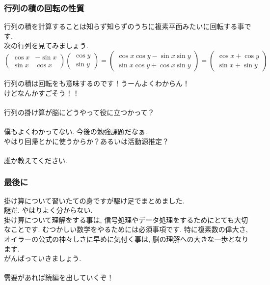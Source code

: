 \documentclass[11pt,a4paper]{jsarticle}
\begin{document}
\subsubsection{行列の積の回転の性質}
行列の積を計算することは知らず知らずのうちに複素平面みたいに回転する事です. \\
次の行列を見てみましょう.\\
\[
  \left(	
  \begin{array}{cc}
  \cos x & -\sin x \\
  \sin x & \cos x
  \end{array}
  \right)
  \left(
  \begin{array}{c}
  \cos y \\
  \sin y
  \end{array}
  \right)
  =
  \left(
  \begin{array}{l}
  \cos x\cos y - \sin x\sin y\\
  \sin x\cos y + \cos x\sin y
  \end{array}
  \right)
  =
  \left(
  \begin{array}{c}
  \cos x + \cos y\\
  \sin x + \sin y
  \end{array}
  \right)
\]

行列の積は回転をも意味するのです！うーんよくわからん！\\
けどなんかすごそう！！\\
\\
行列の掛け算が脳にどうやって役に立つかって？\\
\\
僕もよくわかってない. 今後の勉強課題だなぁ.\\
やはり回帰とかに使うからか？あるいは活動源推定？\\
\\
誰か教えてください.\\
\subsubsection{最後に}
掛け算について習いたての身ですが駆け足でまとめました. \\
謎だ. やはりよく分からない.\\
掛け算について理解をする事は, 信号処理やデータ処理をするためにとても大切なことです. むつかしい数学をやるためには必須事項です. 特に複素数の偉大さ, オイラーの公式の神々しさに早めに気付く事は, 脳の理解への大きな一歩となります.\\
がんばっていきましょう.\\
\\
需要があれば続編を出していくぞ！\\
\end{document}
